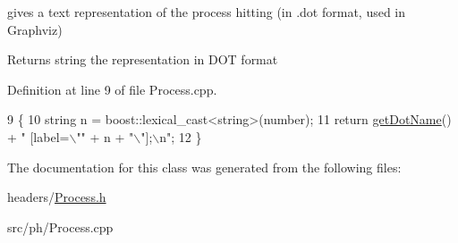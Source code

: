 gives a text representation of the process hitting (in .dot format, used in Graphviz) 

\begin{DoxyReturn}{Returns}
string the representation in D\+O\+T format 
\end{DoxyReturn}


Definition at line 9 of file Process.\+cpp.


\begin{DoxyCode}
9                              \{
10     \textcolor{keywordtype}{string} n = boost::lexical\_cast<\textcolor{keywordtype}{string}>(number);
11     \textcolor{keywordflow}{return} \hyperlink{classProcess_af9a89e83db6a14451104b49eac7dd313}{getDotName}() + \textcolor{stringliteral}{" [label=\(\backslash\)""} + n + \textcolor{stringliteral}{"\(\backslash\)"];\(\backslash\)n"};
12 \}
\end{DoxyCode}


The documentation for this class was generated from the following files\+:\begin{DoxyCompactItemize}
\item 
headers/\hyperlink{Process_8h}{Process.\+h}\item 
src/ph/Process.\+cpp\end{DoxyCompactItemize}
